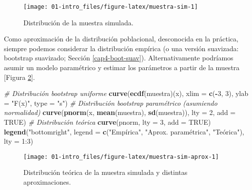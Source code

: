 \documentclass[
]{book}
\newenvironment{Shaded}{\begin{snugshade}}{\end{snugshade}}
\newcommand{\CommentTok}[1]{\textcolor[rgb]{0.56,0.35,0.01}{\textit{#1}}}
\newcommand{\DataTypeTok}[1]{\textcolor[rgb]{0.13,0.29,0.53}{#1}}
\newcommand{\DecValTok}[1]{\textcolor[rgb]{0.00,0.00,0.81}{#1}}
\newcommand{\KeywordTok}[1]{\textcolor[rgb]{0.13,0.29,0.53}{\textbf{#1}}}
\newcommand{\NormalTok}[1]{#1}
\newcommand{\OperatorTok}[1]{\textcolor[rgb]{0.81,0.36,0.00}{\textbf{#1}}}
\newcommand{\OtherTok}[1]{\textcolor[rgb]{0.56,0.35,0.01}{#1}}
\newcommand{\StringTok}[1]{\textcolor[rgb]{0.31,0.60,0.02}{#1}}
\theoremstyle{definition}
\theoremstyle{definition}
\theoremstyle{definition}
\theoremstyle{remark}
\begin{document}
\begin{figure}[!htb]

{\centering \texttt{[image: 01-intro\_files/figure-latex/muestra-sim-1]} 

}

\caption{Distribución de la muestra simulada.}\label{fig:muestra-sim}
\end{figure}

Como aproximación de la distribución poblacional, desconocida en la práctica,
siempre podemos considerar la distribución empírica
(o una versión suavizada: bootstrap suavizado; Sección \ref{cap4-boot-suav}).
Alternativamente podríamos asumir un modelo paramétrico y estimar los parámetros a partir de la muestra {[}Figura \ref{fig:muestra-sim-aprox}{]}.

\begin{Shaded}
\begin{Highlighting}[]
\CommentTok{# Distribución bootstrap uniforme}
\KeywordTok{curve}\NormalTok{(}\KeywordTok{ecdf}\NormalTok{(muestra)(x), }\DataTypeTok{xlim =} \KeywordTok{c}\NormalTok{(}\OperatorTok{-}\DecValTok{3}\NormalTok{, }\DecValTok{3}\NormalTok{), }\DataTypeTok{ylab =} \StringTok{"F(x)"}\NormalTok{, }\DataTypeTok{type =} \StringTok{"s"}\NormalTok{)}
\CommentTok{# Distribución bootstrap paramétrico (asumiendo normalidad)}
\KeywordTok{curve}\NormalTok{(}\KeywordTok{pnorm}\NormalTok{(x, }\KeywordTok{mean}\NormalTok{(muestra), }\KeywordTok{sd}\NormalTok{(muestra)), }\DataTypeTok{lty =} \DecValTok{2}\NormalTok{, }\DataTypeTok{add =} \OtherTok{TRUE}\NormalTok{)}
\CommentTok{# Distribución teórica}
\KeywordTok{curve}\NormalTok{(pnorm, }\DataTypeTok{lty =} \DecValTok{3}\NormalTok{, }\DataTypeTok{add =} \OtherTok{TRUE}\NormalTok{)}
\KeywordTok{legend}\NormalTok{(}\StringTok{"bottomright"}\NormalTok{, }\DataTypeTok{legend =} \KeywordTok{c}\NormalTok{(}\StringTok{"Empírica"}\NormalTok{, }\StringTok{"Aprox. paramétrica"}\NormalTok{, }\StringTok{"Teórica"), lty = 1:3)}
\end{Highlighting}
\end{Shaded}

\begin{figure}[!htb]

{\centering \texttt{[image: 01-intro\_files/figure-latex/muestra-sim-aprox-1]} 

}

\caption{Distribución teórica de la muestra simulada y distintas aproximaciones.}\label{fig:muestra-sim-aprox}
\end{figure}
\end{document}
